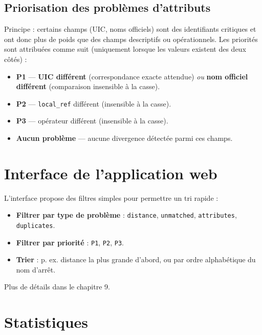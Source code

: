 \subsection{Priorisation des problèmes d'attributs}
Principe : certains champs (UIC, noms officiels) sont des identifiants critiques et ont donc plus de poids que des champs descriptifs ou opérationnels. Les priorités sont attribuées comme suit (uniquement lorsque les valeurs existent des deux côtés) :
\begin{itemize}
  \item \textbf{P1} — \textbf{UIC différent} (correspondance exacte attendue) \emph{ou} \textbf{nom officiel différent} (comparaison insensible à la casse).
  \item \textbf{P2} — \texttt{local\_ref} différent (insensible à la casse).
  \item \textbf{P3} — opérateur différent (insensible à la casse).
  \item \textbf{Aucun problème} — aucune divergence détectée parmi ces champs.
\end{itemize}

\section{Interface de l'application web}
L'interface propose des filtres simples pour permettre un tri rapide :
\begin{itemize}
  \item \textbf{Filtrer par type de problème} : \texttt{distance}, \texttt{unmatched}, \texttt{attributes}, \texttt{duplicates}.
  \item \textbf{Filtrer par priorité} : \texttt{P1}, \texttt{P2}, \texttt{P3}.
  \item \textbf{Trier} : p. ex. distance la plus grande d'abord, ou par ordre alphabétique du nom d'arrêt.
\end{itemize}

Plus de détails dans le chapitre 9.


\section{Statistiques }

